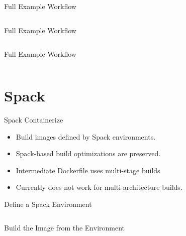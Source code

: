 \documentclass[aspectratio=169]{beamer}
\begin{document}
\begin{frame}{Full Example Workflow}
\inputminted[firstline=1, lastline=5]{lua}{src/molden/molden.lua}
\end{frame}

\begin{frame}{Full Example Workflow}
\inputminted[firstline=7, lastline=15]{lua}{src/molden/molden.lua}
\end{frame}

\begin{frame}{Full Example Workflow}
\inputminted[firstline=17, lastline=28]{lua}{src/molden/molden.lua}
\end{frame}

\section{Spack}

\begin{frame}{Spack Containerize}
\begin{itemize}
\item Build images defined by Spack environments.
\item Spack-based build optimizations are preserved.
\item Intermediate Dockerfile uses multi-stage builds
\item Currently does not work for multi-architecture builds.
\end{itemize}
\end{frame}

\begin{frame}{Define a Spack Environment}
\inputminted{yaml}{src/spack.yaml}
\end{frame}

\begin{frame}{Build the Image from the Environment}
\inputminted{sh}{src/spack_containerize.sh}
\end{frame}




\end{document}
